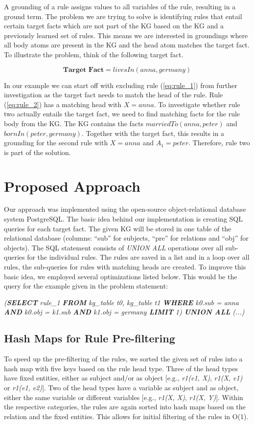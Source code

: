 \documentclass[english]{lni}
\begin{document}
A grounding of a rule assigns values to all variables of the rule, resulting in a ground term. The problem we are trying to solve is identifying rules that entail certain target facts which are not part of the KG based on the KG and a previously learned set of rules. This means we are interested in groundings where all body atoms are present in the KG and the head atom matches the target fact. To illustrate the problem, think of the following target fact.

\[\textbf{Target Fact} = livesIn(anna, germany)\] 

In our example we can start off with excluding rule (\ref{eq:rule_1}) from further investigation as the target fact needs to match the head of the rule. Rule (\ref{eq:rule_2}) has a matching head with \(X = anna\). To investigate whether rule two actually entails the target fact, we need to find matching facts for the rule body from the KG. The KG contains the facts \(marriedTo(anna, peter)\) and \(bornIn(peter, germany)\). Together with the target fact, this results in a grounding for the second rule with \(X = anna\) and \(A_1 = peter\). Therefore, rule two is part of the solution.

\section{Proposed Approach}

Our approach was implemented using the open-source object-relational database system PostgreSQL. The basic idea behind our implementation is creating SQL queries for each target fact. The given KG will be stored in one table of the relational database (columns: “sub” for subjects, “pre” for relations and “obj” for objects). The SQL statement consists of \textit{UNION ALL} operations over all sub-queries for the individual rules. The rules are saved in a list and in a loop over all rules, the sub-queries for rules with matching heads are created. To improve this basic idea, we employed several optimizations listed below. This would be the query for the example given in the problem statement:

\textit{(\textbf{SELECT} rule\_1 \textbf{FROM} kg\_table t0,  kg\_table t1 \textbf{WHERE} k0.sub = anna \textbf{AND} k0.obj = k1.sub \textbf{AND} k1.obj = germany \textbf{LIMIT} 1)  \textbf{UNION ALL} (...)}


\subsection{Hash Maps for Rule Pre-filtering} 
To speed up the pre-filtering of the rules, we sorted the given set of rules into a hash map with five keys based on the rule head type. Three of the head types have fixed entities, either as subject and/or as object [e.g., \textit{r1(e1, X)}, \textit{r1(X, e1)} or \textit{r1(e1, e2)}]. Two of the head types have a variable as subject and as object, either the same variable or different variables [e.g., \textit{r1(X, X)}, \textit{r1(X, Y)}]. Within the respective categories, the rules are again sorted into hash maps based on the relation and the fixed entities. This allows for initial filtering of the rules in O(1).
\end{document}
